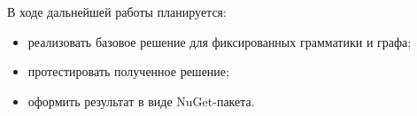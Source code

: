 \documentclass[14pt]{matmex-diploma-custom}
\begin{document}
В ходе дальнейшей работы планируется:
\begin{itemize}
    \item реализовать базовое решение для фиксированных грамматики и графа;
    \item протестировать полученное решение;
    \item оформить результат в виде NuGet-пакета.
\end{itemize}
\setmonofont[Mapping=tex-text]{CMU Typewriter Text}


\end{document}
